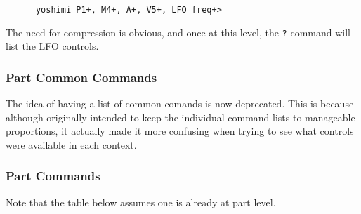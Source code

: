    \begin{verbatim}
      yoshimi P1+, M4+, A+, V5+, LFO freq+>
   \end{verbatim}

   The need for compression is obvious, and once at this level, the \texttt{?}
   command will list the LFO controls.

\subsubsection{Part Common Commands}
\label{subsec:command_line_part_common_commands}
The idea of having a list of common comands is now deprecated. This is
because although originally intended to keep the individual command lists to
manageable proportions, it actually made it more confusing when trying
to see what controls were available in each context.

\subsubsection{Part Commands}
\label{subsec:command_line_part_commands}

   Note that the table below assumes one is already at part level.

